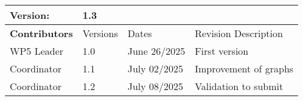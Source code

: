 \begin{tabular}{ >{\raggedright\arraybackslash}p{3cm}| p{2cm} p{3cm} p{7cm} }
    \toprule
    \textbf{Version}: & \multicolumn{3}{l}{1.3} \\ \midrule
    \textbf{Contributors}  & Versions    & Dates       & Revision Description \\ \midrule
    WP5 Leader  & 1.0    & June 26/2025  & First version  \\ 
    Coordinator  & 1.1    & July 02/2025  & Improvement of graphs  \\ 
    Coordinator  & 1.2    & July 08/2025  & Validation to submit  \\ 
    \bottomrule
\end{tabular}  
